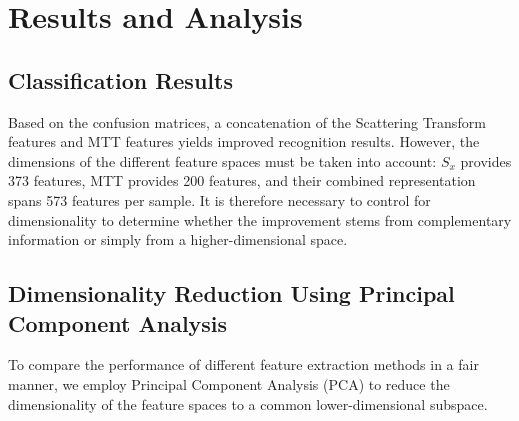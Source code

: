 \chapter{Results and Analysis}
\label{ch:results}


\section{Classification Results}


Based on the confusion matrices, a concatenation of the Scattering Transform features and MTT features yields improved recognition results. However, the dimensions of the different feature spaces must be taken into account: $S_x$ provides 373 features, MTT provides 200 features, and their combined representation spans 573 features per sample. It is therefore necessary to control for dimensionality to determine whether the improvement stems from complementary information or simply from a higher-dimensional space.


\section{Dimensionality Reduction Using Principal Component Analysis}
\label{sec:pca-analysis}

To compare the performance of different feature extraction methods in a fair manner, we employ Principal Component Analysis (PCA) to reduce the dimensionality of the feature spaces to a common lower-dimensional subspace.

